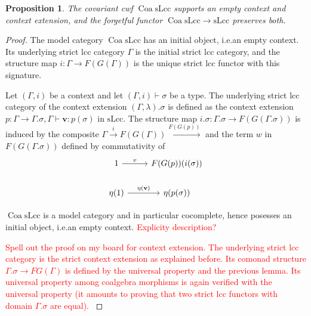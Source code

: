 \documentclass{article}
\newcommand{\todo}[1]{\textcolor{red}{#1}}
\newtheorem{proposition}{Proposition}
\theoremstyle{remark}
\theoremstyle{definition}
\begin{document}
\begin{proposition}
  The covariant cwf $\operatorname{Coa} \mathrm{sLcc}$ supports an empty context and context extension, and the forgetful functor $\operatorname{Coa} \mathrm{sLcc} \rightarrow \mathrm{sLcc}$ preserves both.
\end{proposition}
\begin{proof}
  The model category $\operatorname{Coa} \mathrm{sLcc}$ has an initial object, i.e.\@ an empty context.
  Its underlying strict lcc category $\Gamma$ is the initial strict lcc category, and the structure map $i : \Gamma \rightarrow F(G(\Gamma))$ is the unique strict lcc functor with this signature.

  Let $(\Gamma, i)$ be a context and let $(\Gamma, i) \vdash \sigma$ be a type.
  The underlying strict lcc category of the context extension $(\Gamma,\lambda).\sigma$ is defined as the context extension $p : \Gamma \rightarrow \Gamma.\sigma, \Gamma \vdash \mathbf{v} : p(\sigma)$ in $\mathrm{sLcc}$.
  The structure map $i.\sigma : \Gamma.\sigma \rightarrow F(G(\Gamma.\sigma))$ is induced by the composite $\Gamma \xrightarrow{i} F(G(\Gamma)) \xrightarrow{F(G(p))}$ and the term $w$ in $F(G(\Gamma.\sigma))$ defined by commutativity of
  \begin{equation}
    \begin{tikzcd}
      1 \arrow[r, "v"] & F(G(p))(i(\sigma)) \\
      \eta(1) \arrow[r, "\eta(\mathbf{v})"] & \eta(p(\sigma))
    \end{tikzcd}
  \end{equation}

  $\operatorname{Coa} \mathrm{sLcc}$ is a model category and in particular cocomplete, hence posesses an initial object, i.e.\@ an empty context.
  \todo{Explicity description?}

  \todo{
    Spell out the proof on my board for context extension.
    The underlying strict lcc category is the strict context extension as explained before.
    Its comonad structure $\Gamma.\sigma \rightarrow FG(\Gamma)$ is defined by the universal property and the previous lemma.
    Its universal property among coalgebra morphisms is again verified with the universal property (it amounts to proving that two strict lcc functors with domain $\Gamma.\sigma$ are equal).
  }
\end{proof}
\end{document}
